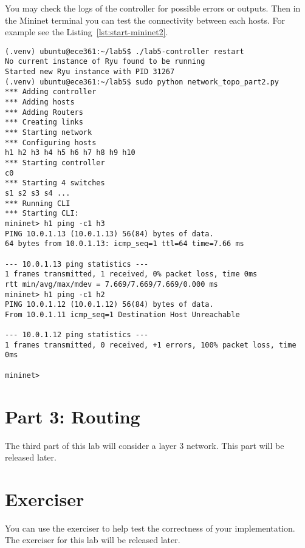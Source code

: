 \documentclass[11pt]{article}
\begin{document}
You may check the logs of the controller for possible errors or outputs.
Then in the Mininet terminal you can test the connectivity between each hosts. For example see the Listing~\ref{lst:start-mininet2}.
\begin{lstlisting}[style=ece361shell, caption={Create the network topology for first part}, label={lst:start-mininet2}]
(.venv) ubuntu@ece361:~/lab5$ ./lab5-controller restart
No current instance of Ryu found to be running
Started new Ryu instance with PID 31267
(.venv) ubuntu@ece361:~/lab5$ sudo python network_topo_part2.py
*** Adding controller
*** Adding hosts
*** Adding Routers
*** Creating links
*** Starting network
*** Configuring hosts
h1 h2 h3 h4 h5 h6 h7 h8 h9 h10
*** Starting controller
c0
*** Starting 4 switches
s1 s2 s3 s4 ...
*** Running CLI
*** Starting CLI:
mininet> h1 ping -c1 h3
PING 10.0.1.13 (10.0.1.13) 56(84) bytes of data.
64 bytes from 10.0.1.13: icmp_seq=1 ttl=64 time=7.66 ms

--- 10.0.1.13 ping statistics ---
1 frames transmitted, 1 received, 0% packet loss, time 0ms
rtt min/avg/max/mdev = 7.669/7.669/7.669/0.000 ms
mininet> h1 ping -c1 h2
PING 10.0.1.12 (10.0.1.12) 56(84) bytes of data.
From 10.0.1.11 icmp_seq=1 Destination Host Unreachable

--- 10.0.1.12 ping statistics ---
1 frames transmitted, 0 received, +1 errors, 100% packet loss, time 0ms

mininet>
\end{lstlisting}


\section{Part 3: Routing}
\label{sec:exercise3}
The third part of this lab will consider a layer 3 network. This part will be released later.

\section{Exerciser}
\label{sec:exercise}
You can use the exerciser to help test the correctness of your implementation. The exerciser for this lab will be released later.
\end{document}
